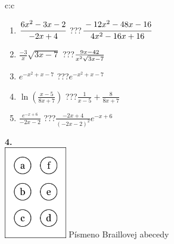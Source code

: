 \documentclass[10pt]{report}
\begin{document}
\begin{tabular}{c:c}
\begin{minipage}[c][104.5mm][t]{0.5\linewidth}
\begin{center}
\begin{minipage}{0.79\linewidth}
\begin{center}
\begin{varwidth}{\linewidth}
\begin{enumerate}
\item $\cfrac{6x^2-3x-2}{-2x+4}$\quad \dotfill\; ???\;\dotfill \quad $\cfrac{-12x^2-48x-16}{4x^2-16x+16}$
\item $\frac{-3}{x}\sqrt{3x-7}$\quad \dotfill\; ???\;\dotfill \quad $\frac{9x-42}{x^2 \sqrt{\smash[b]{3x-7}}}$
\item $e^{-x^2+x-7}$\quad \dotfill\; ???\;\dotfill \quad $e^{-x^2+x-7}$
\item $\ln{\left(\frac{x-5}{8x+7}\right)}$\quad \dotfill\; ???\;\dotfill \quad $\frac{1}{x-5}+\frac{8}{8x+7}$
\item $\frac{e^{-x+6}}{-2x-2}$\quad \dotfill\; ???\;\dotfill \quad $\frac{-2x+4}{(-2x-2)^2}e^{-x+6}$
\end{enumerate}
\end{varwidth}
\end{center}
\end{minipage}
\begin{minipage}{0.20\linewidth}
\begin{center}
{\Huge\bfseries 4.} \\[2mm]
\includegraphics[height=40mm]{../images/braille.png}
{\small Písmeno Braillovej abecedy}
\end{center}
\end{minipage}
\end{center}
\end{minipage}
%
\end{tabular}
\newpage
\thispagestyle{empty}
\end{document}
